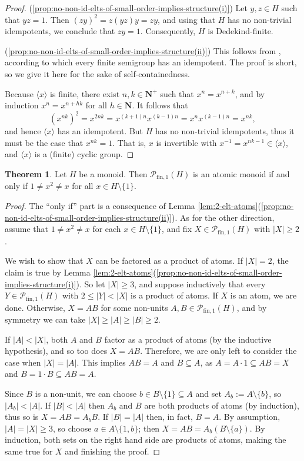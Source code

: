 \documentclass{report}
\renewcommand{\P}{\mathcal{P}}
\newcommand{\gen}[1]{\langle #1 \rangle}
\newcommand{\fun}{{\textrm{fin}, 1}}
\renewcommand{\:}{\text{:}}
\theoremstyle{definition}
\newtheorem{thm}[defn]{Theorem}
\begin{document}
%
\begin{proof}
(\ref{prop:no-non-id-elts-of-small-order-implies-structure(i)})
	Let $y,z\in H$ such that $yz = 1$. Then $(zy)^2 = z(yz)y = zy$, and using that $H$ has no non-trivial i\-dem\-po\-tents, we conclude that $zy=1$. Consequently, $H$ is Dedekind-finite.

(\ref{prop:no-non-id-elts-of-small-order-implies-structure(ii)})
	This follows from \cite[Ch. V, Exercise 4, p. 68]{whitelaw}, according to which every finite semigroup has an idempotent.
 	The proof is short, so we give it here for the sake of self-containedness.
 	
 	Because $\gen{x}$ is finite, there exist $n, k \in \mathbf N^+$ such that $x^n = x^{n+k}$, and by induction $x^n = x^{n+hk}$ for all $h \in \mathbf N$. It follows that
$$
(x^{nk})^2 = x^{2nk} = x^{(k+1)n}x^{(k-1)n} = x^n x^{(k-1)n} = x^{nk},
$$
and hence $\gen{x}$ has an idempotent. But $H$ has no non-trivial idempotents, thus it must be the case that $x^{nk}=1$. That is, $x$ is invertible with $x^{-1} = x^{nk-1} \in \gen{x}$, and $\gen{x}$ is a (finite) cyclic group.
\end{proof}

%

\begin{thm}\label{thm:atomicity}
Let $H$ be a monoid. Then $\mathcal P_\fun(H)$ is an atomic monoid if and only if $1 \ne x^2 \ne x$ for all $x \in H \setminus \{1\}$.
\end{thm}
%
\begin{proof}
The ``only if'' part is a consequence of Lemma \ref{lem:2-elt-atoms}(\ref{prop:no-non-id-elts-of-small-order-implies-structure(ii)}).
As for the other direction, assume that $1 \ne x^2 \ne x$ for each $x\in H\setminus\{1\}$, and fix $X \in \mathcal P_{\fun}(H)$ with $|X| \ge 2$.

We wish to show that $X$ can be factored as a product of atoms.
If $|X| = 2$, the claim is true by Lemma \ref{lem:2-elt-atoms}(\ref{prop:no-non-id-elts-of-small-order-implies-structure(i)}). So let $|X| \ge 3$, and suppose inductively that every $Y \in \P_\fun(H)$ with $2 \le |Y| < |X|$ is a product of atoms. If $X$ is an atom, we are done.
Otherwise, $X = A B$ for some non-units $A, B \in \P_\fun(H)$, and by symmetry we can take $|X| \ge |A| \ge |B| \ge 2$.

If $|A| < |X|$, both $A$ and $B$ factor as a product of atoms (by the inductive hypothesis), and so too does $X=A B$. Therefore, we are only left to consider the case when $|X| = |A|$. This implies $A B = A$ and $B\subseteq A$, as $A=A\cdot 1\subseteq AB=X$ and $B = 1\cdot B\subseteq AB=A$.

Since $B$ is a non-unit, we can choose $b\in B\setminus\{1\} \subseteq A$ and set $A_b := A \setminus \{b\}$, so $|A_b| < |A|$.
If $|B|<|A|$ then $A_b$ and $B$ are both products of atoms (by induction), thus so is $X = AB = A_bB$.
If $|B|=|A|$ then, in fact, $B=A$.
By assumption, $|A| = |X| \ge 3$, so choose $a\in A\setminus\{1,b\}$; then $X=AB = A_b(B\setminus\{a\})$.
By induction, both sets on the right hand side are products of atoms, making the same true for $X$ and finishing the proof.
\end{proof}
\end{document}
